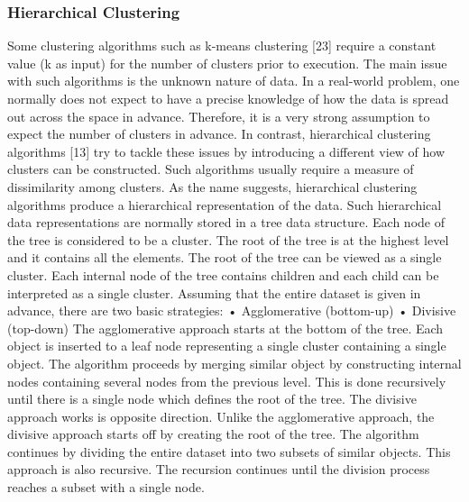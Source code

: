 \documentclass[a4paper, 12pt]{article}
\begin{document}
\subsubsection{Hierarchical Clustering}
Some clustering algorithms such as k-means clustering [23] require a constant value (k as input) for the number of clusters prior to execution. The main issue with such algorithms is the unknown nature of data. In a real-world problem, one normally does not expect to have a precise knowledge of how the data is spread out across the space in advance. Therefore, it is a very strong assumption to expect the number of clusters in advance. In contrast, hierarchical clustering algorithms [13] try to tackle these issues by introducing a different view of how clusters can be constructed. Such algorithms usually require a measure of dissimilarity among clusters.
As the name suggests, hierarchical clustering algorithms produce a hierarchical representation of the data. Such hierarchical data representations are normally stored in a tree data structure. Each node of the tree is considered to be a cluster. The root of the tree is at the highest level and it contains all the elements. The root of the tree can be viewed as a single cluster. Each internal node of the tree contains children and each child can be interpreted as a single cluster. Assuming that the entire dataset is given in advance, there are two basic strategies:
•	Agglomerative (bottom-up)
•	Divisive (top-down)
The agglomerative approach starts at the bottom of the tree. Each object is inserted to a leaf node representing a single cluster containing a single object. The algorithm proceeds by merging similar object by constructing internal nodes containing several nodes from the previous level. This is done recursively until there is a single node which defines the root of the tree.
The divisive approach works is opposite direction. Unlike the agglomerative approach, the divisive approach starts off by creating the root of the tree. The algorithm continues by dividing the entire dataset into two subsets of similar objects. This approach is also recursive. The recursion continues until the division process reaches a subset with a single node. 



\end{document}

